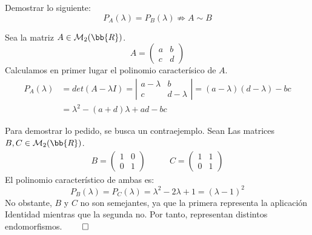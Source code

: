 \begin{ejercicio*} Demostrar lo siguiente:
    \begin{equation*}
        P_A(\lambda) = P_B(\lambda) \nRightarrow A \sim B 
    \end{equation*}

    Sea la matriz $A \in \mathcal{M}_2(\bb{R})$.
    \begin{equation*}
        A = \left(\begin{array}{cc}
            a & b \\
            c & d
        \end{array} \right)
    \end{equation*}
    Calculamos en primer lugar el polinomio caracterísico de $A$.
    \begin{equation*}\begin{split}
        P_A(\lambda) & = det(A-\lambda I)
        = \left| \begin{array}{cc}
            a-\lambda & b \\
            c & d-\lambda
        \end{array} \right|
        = (a-\lambda)(d-\lambda) - bc \\
        & = \lambda ^2 - (a+d)\lambda + ad -bc
    \end{split}\end{equation*}

    Para demostrar lo pedido, se busca un contraejemplo. Sean Las matrices $B,C \in \mathcal{M}_2(\bb{R})$.
    \begin{equation*}\begin{split}
        B = \left(\begin{array}{cc}
            1 & 0 \\
            0 & 1
        \end{array} \right)
        \quad & \quad
        C = \left(\begin{array}{cc}
            1 & 1 \\
            0 & 1
        \end{array} \right)
    \end{split}\end{equation*}
    El polinomio característico de ambas es:
    \begin{equation*}
        P_B(\lambda) = P_C(\lambda) = \lambda ^2 - 2\lambda + 1 = (\lambda -1)^2
    \end{equation*}
    No obstante, $B$ y $C$ no son semejantes, ya que la primera representa la aplicación Identidad mientras que la segunda no. Por tanto, representan distintos endomorfismos. $\hfill \qed$
\end{ejercicio*}

